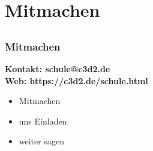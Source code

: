 \documentclass[aspectratio=169]{beamer}
\begin{document}
\section*{Mitmachen}
\subsection*{}

\begin{frame}
	\frametitle{Mitmachen}
	\begin{center}
		\textbf{Kontakt: schule@c3d2.de \\
    Web: https://c3d2.de/schule.html}
	\end{center}
	\begin{itemize}
		\item<2-> Mitmachen
		\item<3-> uns Einladen
		\item<4-> weiter sagen
	\end{itemize}
\end{frame}
\end{document}
